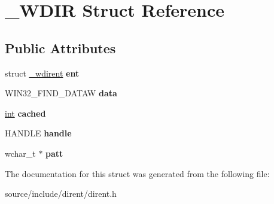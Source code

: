 \hypertarget{struct___w_d_i_r}{}\section{\+\_\+\+W\+D\+I\+R Struct Reference}
\label{struct___w_d_i_r}
\subsection*{Public Attributes}
\begin{DoxyCompactItemize}
\item 
\hypertarget{struct___w_d_i_r_a84ae1457352005f813ed4b3dc1994b62}{}struct \hyperlink{struct__wdirent}{\+\_\+wdirent} {\bfseries ent}\label{struct___w_d_i_r_a84ae1457352005f813ed4b3dc1994b62}

\item 
\hypertarget{struct___w_d_i_r_a065b17b666ee06c4e8068d8accb0eef9}{}W\+I\+N32\+\_\+\+F\+I\+N\+D\+\_\+\+D\+A\+T\+A\+W {\bfseries data}\label{struct___w_d_i_r_a065b17b666ee06c4e8068d8accb0eef9}

\item 
\hypertarget{struct___w_d_i_r_a9b7432df163d1e291ba5925347fd4af3}{}\hyperlink{_s_d_l__thread_8h_a6a64f9be4433e4de6e2f2f548cf3c08e}{int} {\bfseries cached}\label{struct___w_d_i_r_a9b7432df163d1e291ba5925347fd4af3}

\item 
\hypertarget{struct___w_d_i_r_a694510e166fd3e797b3e15b9e4b3810a}{}H\+A\+N\+D\+L\+E {\bfseries handle}\label{struct___w_d_i_r_a694510e166fd3e797b3e15b9e4b3810a}

\item 
\hypertarget{struct___w_d_i_r_a700ff3a1096fb36452c571b0f55b4e60}{}wchar\+\_\+t $\ast$ {\bfseries patt}\label{struct___w_d_i_r_a700ff3a1096fb36452c571b0f55b4e60}

\end{DoxyCompactItemize}


The documentation for this struct was generated from the following file\+:\begin{DoxyCompactItemize}
\item 
source/include/dirent/dirent.\+h\end{DoxyCompactItemize}

